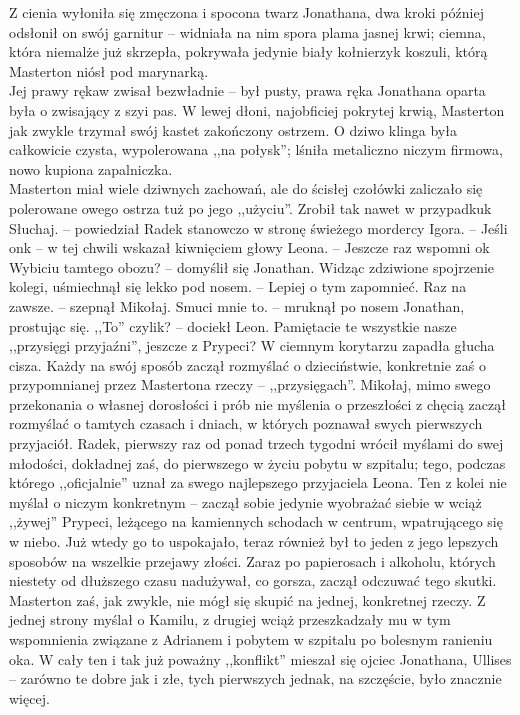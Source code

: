 \documentclass[../MAIN.tex]{subfiles}
\begin{document}
\qd
Z cienia wyłoniła się zmęczona i spocona twarz Jonathana, dwa kroki później odsłonił on swój garnitur -- widniała na nim spora plama jasnej krwi; ciemna, która niemalże już skrzepła, pokrywała jedynie biały kołnierzyk koszuli, którą Masterton niósł pod marynarką.\\
Jej prawy rękaw zwisał bezwładnie -- był pusty, prawa ręka Jonathana oparta była o zwisający z szyi pas. W lewej dłoni, najobficiej pokrytej krwią, Masterton jak zwykle trzymał swój kastet zakończony ostrzem. O dziwo klinga była całkowicie czysta, wypolerowana ,,na połysk''; lśniła metaliczno niczym firmowa, nowo kupiona zapalniczka.\\
Masterton miał wiele dziwnych zachowań, ale do ścisłej czołówki zaliczało się polerowane owego ostrza tuż po jego ,,użyciu''. Zrobił tak nawet w przypadku\3k
\sx Słuchaj. -- powiedział Radek stanowczo w stronę świeżego mordercy Igora. -- Jeśli on\3k -- w tej chwili wskazał kiwnięciem głowy Leona. -- Jeszcze raz wspomni o\3k
\xx Wybiciu tamtego obozu? -- domyślił się Jonathan. Widząc zdziwione spojrzenie kolegi, uśmiechnął się lekko pod nosem. -- Lepiej o tym zapomnieć.
\xx Raz na zawsze. -- szepnął Mikołaj.
\xx Smuci mnie to. -- mruknął po nosem Jonathan, prostując się.
\xx ,,To'' czyli\3k? -- dociekł Leon.
\xx Pamiętacie te wszystkie nasze ,,przysięgi przyjaźni'', jeszcze z Prypeci?
\qd
W ciemnym korytarzu zapadła głucha cisza. Każdy na swój sposób zaczął rozmyślać o dzieciństwie, konkretnie zaś o przypomnianej przez Mastertona rzeczy -- ,,przysięgach''. Mikołaj, mimo swego przekonania o własnej dorosłości i prób nie myślenia o przeszłości z chęcią zaczął rozmyślać o tamtych czasach i dniach, w których poznawał swych pierwszych przyjaciół. Radek, pierwszy raz od ponad trzech tygodni wrócił myślami do swej młodości, dokładnej zaś, do pierwszego w życiu pobytu w szpitalu; tego, podczas którego ,,oficjalnie'' uznał za swego najlepszego przyjaciela Leona. Ten z kolei nie myślał o niczym konkretnym -- zaczął sobie jedynie wyobrażać siebie w wciąż ,,żywej'' Prypeci, leżącego na kamiennych schodach w centrum, wpatrującego się w niebo. Już wtedy go to uspokajało, teraz również był to jeden z jego lepszych sposobów na wszelkie przejawy złości. Zaraz po papierosach i alkoholu, których niestety od dłuższego czasu nadużywał, co gorsza, zaczął odczuwać tego skutki.\\
Masterton zaś, jak zwykle, nie mógł się skupić na jednej, konkretnej rzeczy. Z jednej strony myślał o Kamilu, z drugiej wciąż przeszkadzały mu w tym wspomnienia związane z Adrianem i pobytem w szpitalu po bolesnym ranieniu oka. W cały ten i tak już poważny ,,konflikt'' mieszał się ojciec Jonathana, Ullises -- zarówno te dobre jak i złe, tych pierwszych jednak, na szczęście, było znacznie więcej.\\
\end{document}
